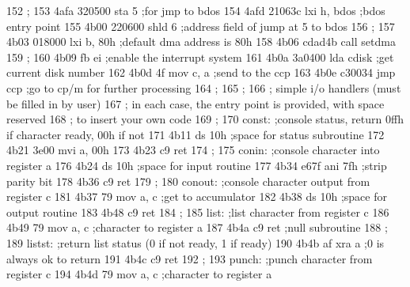 152                       ;
153      4afa 320500               sta    5              ;for jmp to bdos
154      4afd 21063c               lxi    h, bdos        ;bdos entry point
155      4b00 220600               shld   6              ;address field of jump at 5 to bdos
156                       ;
157      4b03 018000               lxi    b, 80h         ;default dma address is 80h
158      4b06 cdad4b               call   setdma
159                       ;
160      4b09 fb                   ei                    ;enable the interrupt system
161      4b0a 3a0400               lda    cdisk          ;get current disk number
162      4b0d 4f                   mov    c, a           ;send to the ccp
163      4b0e c30034               jmp    ccp            ;go to cp/m for further processing
164                       ;
165                       ;
166                       ;        simple i/o handlers (must be filled in by user)
167                       ;        in each case, the entry point is provided, with space reserved
168                       ;        to insert your own code
169                       ;
170                       const:   ;console status, return 0ffh if character ready, 00h if not
171      4b11                      ds     10h            ;space for status subroutine
172      4b21 3e00                 mvi    a, 00h
173      4b23 c9                   ret
174                       ;
175                       conin:   ;console character into register a
176      4b24                      ds     10h            ;space for input routine
177      4b34 e67f                 ani    7fh            ;strip parity bit
178      4b36 c9                   ret
179                       ;
180                       conout:  ;console character output from register c
181      4b37 79                   mov    a, c           ;get to accumulator
182      4b38                      ds     10h            ;space for output routine
183      4b48 c9                   ret
184                       ;
185                       list:    ;list character from register c
186      4b49 79                   mov    a, c           ;character to register a
187      4b4a c9                   ret                   ;null subroutine
188                       ;
189                       listst:  ;return list status (0 if not ready, 1 if ready)
190      4b4b af                   xra    a              ;0 is always ok to return
191      4b4c c9                   ret
192                       ;
193                       punch:   ;punch character from register c
194      4b4d 79                   mov    a, c           ;character to register a
